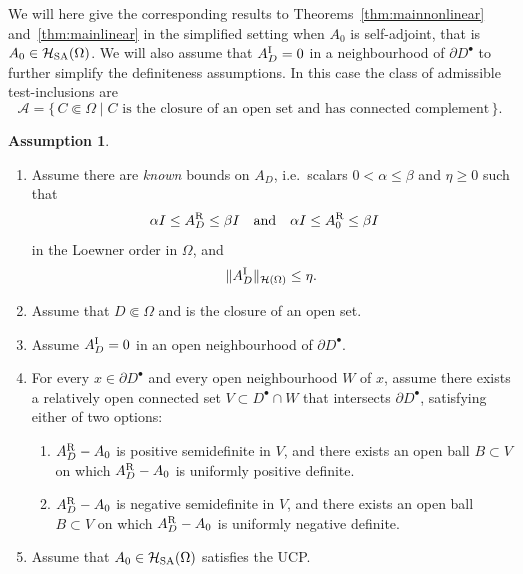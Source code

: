 \documentclass[reqno]{amsart}
\numberwithin{equation}{section}
\numberwithin{figure}{section}
\numberwithin{table}{section}
\theoremstyle{plain}
\theoremstyle{definition}
\newtheorem{assumption}[theorem]{Assumption}
\theoremstyle{remark}
\newcommand{\norm}[1]{\lVert#1\rVert}
\newcommand{\upR}{^{\textup{R}}}
\newcommand{\upI}{^{\textup{I}}}
\newcommand{\AR}{A\upR}
\newcommand{\AI}{A\upI}
\newcommand{\Hsa}{\mathcal{H}_{\textup{SA}}}
\begin{document}
	We will here give the corresponding results to Theorems~\ref{thm:mainnonlinear} and~\ref{thm:mainlinear} in the simplified setting when $A_0$ is self-adjoint, that is $A_0\in\Hsa(\Omega)$. We will also assume that $\AI_D = 0$ in a neighbourhood of $\partial D^\bullet$ to further simplify the definiteness assumptions. In this case the class of admissible test-inclusions are
	\begin{equation*}
		\mathcal{A} = \{\, C \Subset \Omega \mid C \text{ is the closure of an open set and has connected complement} \,\}.
	\end{equation*}
	\begin{assumption}  \label{assump:recon2}  {}\
		\begin{enumerate}[\rm(i)]
			\item Assume there are \emph{known} bounds on $A_D$, i.e.\ scalars $0 < \alpha \leq \beta$ and $\eta\geq 0$ such that
			\begin{equation*}
				\alpha I \leq \AR_D \leq \beta I \quad \text{and} \quad \alpha I \leq \AR_0 \leq \beta I \quad
			\end{equation*}
			in the Loewner order in $\Omega$, and
			\begin{equation*}
				\norm{\AI_D}_{\mathcal{H}(\Omega)} \leq \eta.
			\end{equation*}
			\item Assume that $D\Subset \Omega$ and is the closure of an open set.
			\item Assume $\AI_D = 0$ in an open neighbourhood of $\partial D^\bullet$.
			\item For every $x\in\partial D^\bullet$ and every open neighbourhood $W$ of $x$, assume there exists a relatively open connected set $V\subset D^\bullet\cap W$ that intersects $\partial D^\bullet$, satisfying either of two options:
			\begin{enumerate}[\rm(a)]
				\item $\AR_D - A_0$ is positive semidefinite in $V$, and there exists an open ball $B\subset V$ on which $\AR_D - A_0$ is uniformly positive definite.
				\item $\AR_D - A_0$ is negative semidefinite in $V$, and there exists an open ball $B\subset V$ on which $\AR_D - A_0$ is uniformly negative definite.
			\end{enumerate}
			\item Assume that $A_0\in\Hsa(\Omega)$ satisfies the UCP.
		\end{enumerate}
	\end{assumption}	
		
\end{document}
